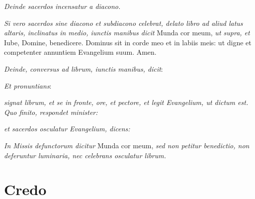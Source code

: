 
\textit{Deinde sacerdos incensatur a diacono.}

\divisio

\textit{Si vero sacerdos sine diacono et subdiacono celebrat, delato libro ad
aliud latus altaris, inclinatus in medio, iunctis manibus dicit} Munda cor meum,
\textit{ut supra, et} Iube, Domine, benedicere.  Dominus sit in corde meo
et in labiis meis: ut digne et competenter annuntiem Evangelium suum.  Amen.

\textit{Deinde, conversus ad librum, iunctis manibus, dicit}:


\textit{Et pronuntians}:


\textit{%
    signat librum, et se in fronte, ore, et pectore, et legit Evangelium, ut
    dictum est.  Quo finito, respondet minister:
}


\textit{et sacerdos osculatur Evangelium, dicens:}


\textit{In Missis defunctorum dicitur} Munda cor meum, \textit{sed non petitur
benedictio, non deferuntur luminaria, nec celebrans osculatur librum.}

\divisio

\section{Credo}

